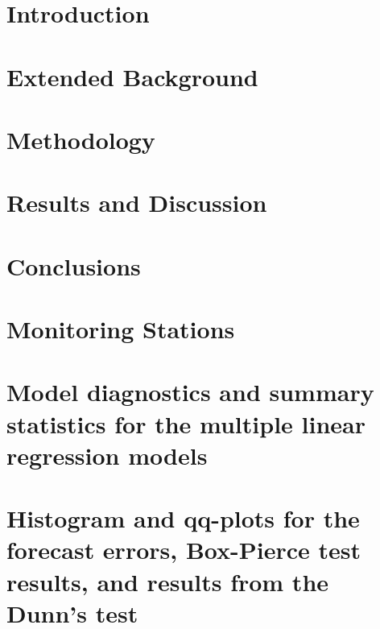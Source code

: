\documentclass[12pt]{report}
\numberwithin{equation}{section}
\begin{document}
\chapter{Introduction}
\setcounter{page}{1}


\chapter{Extended Background}


\chapter{Methodology}


\chapter{Results and Discussion}


\chapter{Conclusions}


{}


%

\appendix
{}

\chapter{Monitoring Stations}


\chapter{Model diagnostics and summary statistics for the multiple linear regression models}


\chapter{Histogram and qq-plots for the forecast errors, Box-Pierce test results, and results from the Dunn's test}

\end{document}
